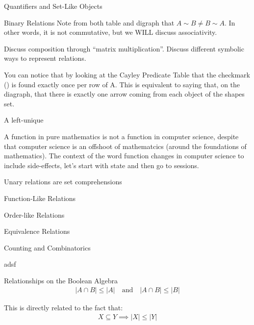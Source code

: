 \begin{part}{Quantifiers and Set-Like Objects}
\begin{chapter}{Binary Relations}
        Note from both table and digraph that $A \sim B \neq B \sim A$. In other words, it is not commutative, but we WILL discuss associativity.
        
        Discuss composition through ``matrix multiplication''. Discuss different symbolic ways to represent relations.
        
        You can notice that by looking at the Cayley Predicate Table that the checkmark (\cmark) is found exactly once per row of A. This is equivalent to saying that, on the diagraph, that there is exactly one arrow coming from each object of the shapes set.
        
        \begin{definition}
            A left-unique 
        \end{definition}
        
        A function in pure mathematics is not a function in computer science, despite that computer science is an offshoot of mathematcics (around the foundations of mathematics). The context of the word function changes in computer science to include side-effects, let's start with state and then go to sessions.
    
        Unary relations are set comprehensions
        \begin{section}{Function-Like Relations}
        \end{section}
        
        \begin{section}{Order-like Relations}
        
        \end{section}
        
        \begin{section}{Equivalence Relations}
        \end{section}
    \end{chapter}
    \begin{chapter}{Counting and Combinatorics}
        \begin{section}{adsf}
            \begin{subsection}{Relationships on the Boolean Algebra}
                \begin{align*}
                    |A \cap B| \leq |A| \quad  \textrm{and} \quad  |A \cap B| \leq |B|
                \end{align*}
                
                This is directly related to the fact that:
                \begin{align*}
                    X \subseteq Y \implies |X| \leq |Y|
                \end{align*}
                

\end{subsection}
\end{section}
\end{chapter}
\end{part}
